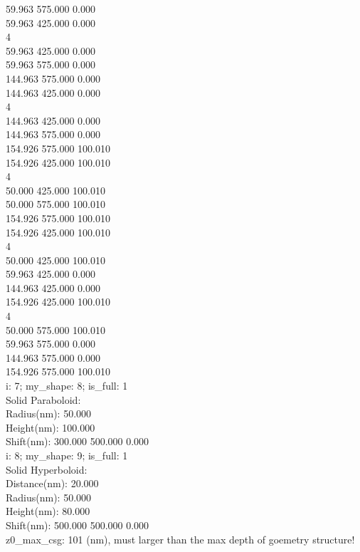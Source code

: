   59.963  575.000    0.000\\
  59.963  425.000    0.000\\
   4\\
  59.963  425.000    0.000\\
  59.963  575.000    0.000\\
 144.963  575.000    0.000\\
 144.963  425.000    0.000\\
   4\\
 144.963  425.000    0.000\\
 144.963  575.000    0.000\\
 154.926  575.000  100.010\\
 154.926  425.000  100.010\\
   4\\
  50.000  425.000  100.010\\
  50.000  575.000  100.010\\
 154.926  575.000  100.010\\
 154.926  425.000  100.010\\
   4\\
  50.000  425.000  100.010\\
  59.963  425.000    0.000\\
 144.963  425.000    0.000\\
 154.926  425.000  100.010\\
   4\\
  50.000  575.000  100.010\\
  59.963  575.000    0.000\\
 144.963  575.000    0.000\\
 154.926  575.000  100.010\\
i: 7; my\_shape:  8; is\_full:   1\\
  Solid Paraboloid:\\
    Radius(nm):   50.000\\
    Height(nm):  100.000\\
    Shift(nm):  300.000  500.000    0.000\\
i: 8; my\_shape:  9; is\_full:   1\\
  Solid Hyperboloid:\\
    Distance(nm):   20.000\\
      Radius(nm):   50.000\\
      Height(nm):   80.000\\
    Shift(nm):  500.000  500.000    0.000\\
z0\_max\_csg: 101 (nm), must larger than the max depth of goemetry structure!\\

